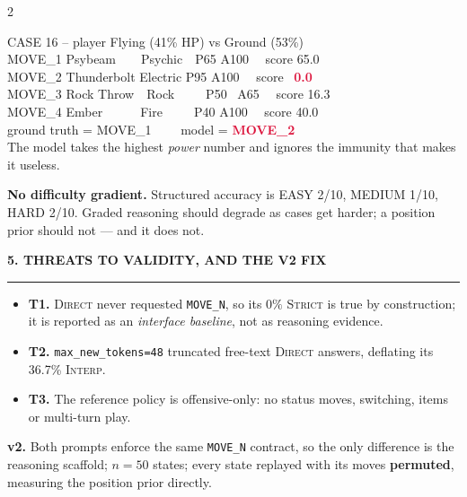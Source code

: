\documentclass[9pt,a4paper]{extarticle}
\newcommand{\heading}[1]{%
  \par\vspace{1.4mm}\noindent
  {\color{navy}\bfseries\small\MakeUppercase{#1}}
  \par\vspace{0.7mm}\noindent
  {\color{amber}\rule{\linewidth}{1.1pt}}
  \par\vspace{0.6mm}\noindent\ignorespaces}
\begin{document}
\begin{multicols}{2}
\vspace{-0.5mm}
\begin{quietbox}
{\footnotesize\ttfamily
CASE 16 -- player Flying (41\% HP) vs Ground (53\%)\\[0.4mm]
MOVE\_1 Psybeam\ \ \ \ Psychic\ \ P65 A100 \ \ score 65.0\\
MOVE\_2 Thunderbolt Electric P95 A100 \ \ score \ \textcolor{crimson}{\textbf{0.0}}\\
MOVE\_3 Rock Throw\ \ Rock\ \ \ \ \ P50 \ A65 \ \ score 16.3\\
MOVE\_4 Ember\ \ \ \ \ \ Fire\ \ \ \ \ P40 A100 \ \ score 40.0\\[0.6mm]
ground truth = MOVE\_1 \ \ \ \ model = \textcolor{crimson}{\textbf{MOVE\_2}}}\\[0.6mm]
{\footnotesize The model takes the highest \emph{power} number and ignores the immunity that makes it useless.}
\end{quietbox}

\textbf{No difficulty gradient.} Structured accuracy is EASY 2/10, MEDIUM 1/10, HARD 2/10. Graded reasoning should degrade as cases get harder; a position prior should not --- and it does not.

\heading{5. Threats to validity, and the v2 fix}
\begin{itemize}
\item \textbf{T1.} \textsc{Direct} never requested \texttt{MOVE\_N}, so its $0\%$ \textsc{Strict} is true by construction; it is reported as an \emph{interface baseline}, not as reasoning evidence.
\item \textbf{T2.} \texttt{max\_new\_tokens=48} truncated free-text \textsc{Direct} answers, deflating its 36.7\% \textsc{Interp}.
\item \textbf{T3.} The reference policy is offensive-only: no status moves, switching, items or multi-turn play.
\end{itemize}
\textbf{v2.} Both prompts enforce the same \texttt{MOVE\_N} contract, so the only difference is the reasoning scaffold; $n=50$ states; every state replayed with its moves \textbf{permuted}, measuring the position prior directly.


\end{multicols}
\end{document}
